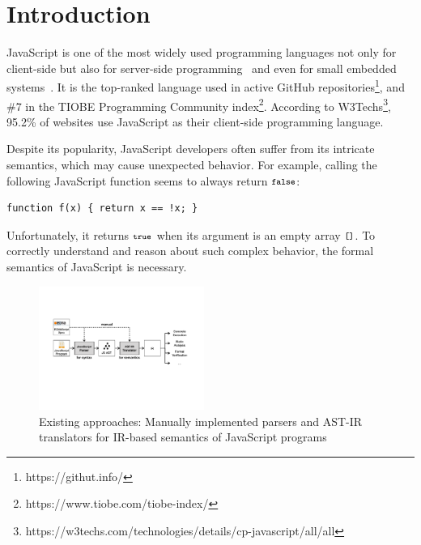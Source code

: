 \section{Introduction}
JavaScript is one of the most widely used programming languages not only for client-side
but also for server-side programming~\cite{nodejs, meanjs}
and even for small embedded systems~\cite{espruino, tessel2}.
It is the top-ranked language used in active GitHub
repositories\footnote{https://githut.info/}, and \#7 in the TIOBE
Programming Community index\footnote{https://www.tiobe.com/tiobe-index/}.
According to W3Techs\footnote{https://w3techs.com/technologies/details/cp-javascript/all/all},
95.2\% of websites use JavaScript as their client-side programming language.

Despite its popularity, JavaScript developers often suffer from its intricate semantics,
which may cause unexpected behavior.  For example, calling the following JavaScript
function seems to always return \( \texttt{\footnotesize false} \):
\begin{lstlisting}[style=myJSstyle]
    function f(x) { return x == !x; }
\end{lstlisting}
Unfortunately, it returns \( \texttt{\footnotesize true} \) when its argument is an empty array
\( \texttt{\footnotesize[]} \).  To correctly understand and reason about such complex
behavior, the formal semantics of JavaScript is necessary.

\begin{figure}
  \centering
  \includegraphics[width=0.48\textwidth]{img/existing.pdf}
\vspace*{-2em}
  \caption{Existing approaches: Manually implemented parsers and AST-IR
  translators for IR-based semantics of JavaScript programs}
  \label{fig:existing}
\vspace*{-1em}
\end{figure}

